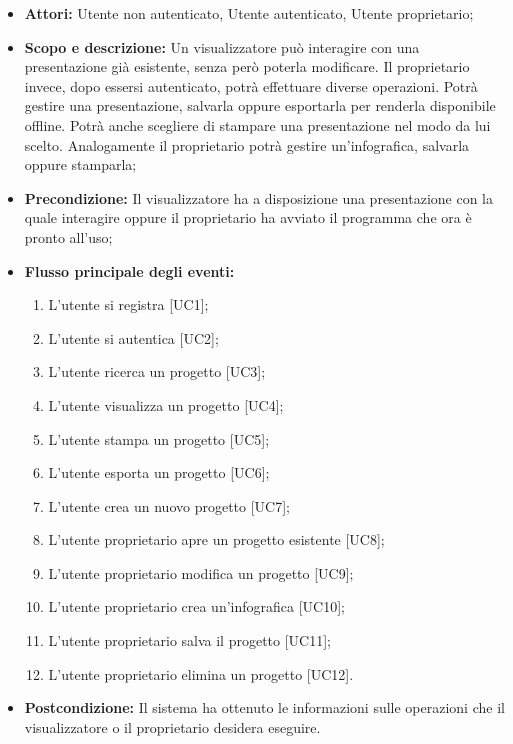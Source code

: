 \begin{itemize}
	\item \textbf{Attori:} Utente non autenticato, Utente autenticato, Utente proprietario;
	
	\item \textbf{Scopo e descrizione:} Un visualizzatore può interagire con una presentazione già esistente, senza però poterla modificare. Il proprietario invece, dopo essersi autenticato, potrà effettuare diverse operazioni. Potrà gestire una presentazione, salvarla oppure esportarla per renderla disponibile offline. Potrà anche scegliere di stampare una presentazione nel modo da lui scelto. Analogamente il proprietario potrà gestire un'infografica, salvarla oppure stamparla;
	
	\item \textbf{Precondizione:} Il visualizzatore ha a disposizione una presentazione con la quale interagire oppure il proprietario ha avviato il programma che ora è pronto all'uso;
	
	\item \textbf{Flusso principale degli eventi:}
	\begin{enumerate}
		\item L'utente si registra [UC1];
		\item L'utente si autentica [UC2];
		\item L'utente ricerca un progetto [UC3];
		\item L'utente visualizza un progetto [UC4];
		\item L'utente stampa un progetto [UC5];
		\item L'utente esporta un progetto [UC6];
		\item L'utente crea un nuovo progetto [UC7];
		\item L'utente proprietario apre un progetto esistente [UC8];
		\item L'utente proprietario modifica un progetto [UC9];
		\item L'utente proprietario crea un'infografica [UC10];
		\item L'utente proprietario salva il progetto [UC11];
		\item L'utente proprietario elimina un progetto [UC12].
	\end{enumerate}
	
	\item \textbf{Postcondizione:} Il sistema ha ottenuto le informazioni sulle operazioni che il visualizzatore o il proprietario desidera eseguire.
\end{itemize}

